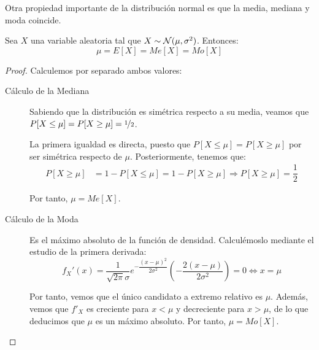 Otra propiedad importante de la distribución normal es que la media, mediana y moda coincide.
\begin{coro}
    Sea $X$ una variable aleatoria tal que $X\sim \mathcal{N}(\mu,\sigma^2)$. Entonces:
    \begin{equation*}
        \mu = E[X] = Me[X] = Mo[X]
    \end{equation*}
\end{coro}
\begin{proof}
    Calculemos por separado ambos valores:
    \begin{description}
        \item[Cálculo de la Mediana] Sabiendo que la distribución es simétrica respecto a su media, 
        veamos que $P[X\leq \mu] = P[X\geq \mu] = \nicefrac{1}{2}$.

        La primera igualdad es directa, puesto que $P[X\leq \mu] = P[X\geq \mu]$ por ser simétrica respecto de $\mu$.
        Posteriormente, tenemos que:
        \begin{align*}
            P[X\geq \mu] &= 1-P[X\leq \mu] = 1-P[X\geq \mu] \Longrightarrow P[X\geq \mu] = \dfrac{1}{2}
        \end{align*}

        Por tanto, $\mu=Me[X]$.

        \item[Cálculo de la Moda] Es el máximo absoluto de la función de densidad. Calculémoslo mediante el estudio de la primera derivada:
        \begin{equation*}
            f_X'(x) = \dfrac{1}{\sqrt{2\pi}\sigma} e^{-\dfrac{(x-\mu)^2}{2\sigma^2}} \left(-\dfrac{2(x-\mu)}{2\sigma^2}\right) = 0\Longleftrightarrow x=\mu
        \end{equation*}
        
        Por tanto, vemos que el único candidato a extremo relativo es $\mu$. Además, vemos que $f'_X$ es creciente para $x<\mu$ y decreciente para $x>\mu$,
        de lo que deducimos que $\mu$ es un máximo absoluto. Por tanto, $\mu = Mo[X]$.
        \qedhere
    \end{description}
\end{proof}

